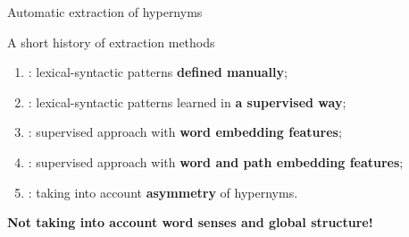 \documentclass[usenames,dvipsnames]{beamer}
\begin{document}
\begin{frame}{Automatic extraction of hypernyms}

\vspace{-10pt}
\begin{block}{A short history of extraction methods}
\begin{enumerate}
	\item \cite{hearst1992automatic}: lexical-syntactic patterns \textbf{\alert{defined manually}};

	\pause 
		
	\item \cite{snow2004learning}: lexical-syntactic patterns learned in \textbf{\alert{a supervised way}};
	
	\pause 
	
	\item \cite{weeds2014learning}: supervised approach with \textbf{\alert{word embedding features}};
	
	\item \cite{shwartz-goldberg-dagan:2016:P16-1}: supervised approach with \textbf{\alert{word and path embedding features}};
	
	\item \cite{glavavs-ponzetto:2017:EMNLP2017,ustalov-EtAl:2017:EACLshort}: taking into account \textbf{\alert{asymmetry}} of hypernyms.

\end{enumerate}
\end{block}

\pause 

\textbf{Not taking into account \alert{word senses} and \alert{global structure}!}

 
\end{frame}
\end{document}
